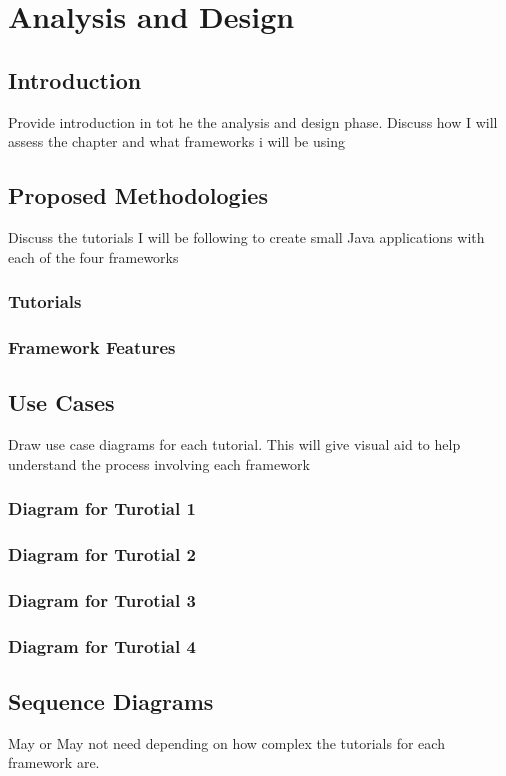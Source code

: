 \chapter*{Analysis and Design}
\section{Introduction}
Provide introduction in tot he the analysis and design phase.
Discuss how I will assess the chapter and what frameworks i will be using
\section{Proposed Methodologies}
Discuss the tutorials I will be following to create small Java applications
with each of the four frameworks
\subsection{Tutorials}
\subsection{Framework Features}

\section{Use Cases}
Draw use case diagrams for each tutorial. This will give visual aid to help
understand the process involving each framework
\subsection{Diagram for Turotial 1}
\subsection{Diagram for Turotial 2}
\subsection{Diagram for Turotial 3}
\subsection{Diagram for Turotial 4}

\section{Sequence Diagrams}
May or May not need depending on how complex the tutorials for each 
framework are.
